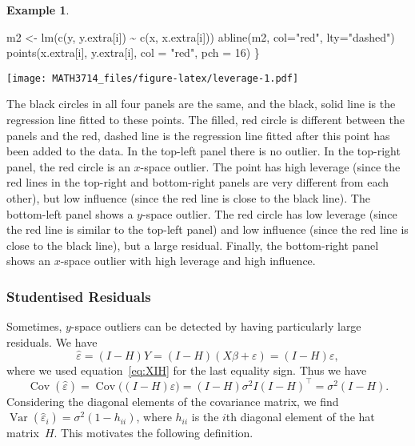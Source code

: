 \documentclass[
  a4paper,
]{article}
\newenvironment{Shaded}{\begin{snugshade}}{\end{snugshade}}
\newcommand{\AttributeTok}[1]{\textcolor[rgb]{0.77,0.63,0.00}{#1}}
\newcommand{\DecValTok}[1]{\textcolor[rgb]{0.00,0.00,0.81}{#1}}
\newcommand{\FunctionTok}[1]{\textcolor[rgb]{0.00,0.00,0.00}{#1}}
\newcommand{\NormalTok}[1]{#1}
\newcommand{\OtherTok}[1]{\textcolor[rgb]{0.56,0.35,0.01}{#1}}
\newcommand{\SpecialCharTok}[1]{\textcolor[rgb]{0.00,0.00,0.00}{#1}}
\newcommand{\StringTok}[1]{\textcolor[rgb]{0.31,0.60,0.02}{#1}}
\theoremstyle{definition}
\theoremstyle{definition}
\newtheorem{example}{Example}[section]
\theoremstyle{definition}
\theoremstyle{definition}
\theoremstyle{remark}
\begin{document}
\begin{example}
\begin{Shaded}
\begin{Highlighting}[]
\NormalTok{    m2 }\OtherTok{\textless{}{-}} \FunctionTok{lm}\NormalTok{(}\FunctionTok{c}\NormalTok{(y, y.extra[i]) }\SpecialCharTok{\textasciitilde{}} \FunctionTok{c}\NormalTok{(x, x.extra[i]))}
    \FunctionTok{abline}\NormalTok{(m2, }\AttributeTok{col=}\StringTok{"red"}\NormalTok{, }\AttributeTok{lty=}\StringTok{"dashed"}\NormalTok{)}
    \FunctionTok{points}\NormalTok{(x.extra[i], y.extra[i], }\AttributeTok{col =} \StringTok{"red"}\NormalTok{, }\AttributeTok{pch =} \DecValTok{16}\NormalTok{)}
\NormalTok{\}}
\end{Highlighting}
\end{Shaded}

\texttt{[image: MATH3714\_files/figure-latex/leverage-1.pdf]}

The black circles in all four panels are the same, and the black, solid line is
the regression line fitted to these points. The filled, red circle is
different between the panels and the red, dashed line is the regression line
fitted after this point has been added to the data. In the top-left panel
there is no outlier. In the top-right panel, the red circle is an \(x\)-space
outlier. The point has high leverage (since the red lines in the top-right and
bottom-right panels are very different from each other), but low influence
(since the red line is close to the black line). The bottom-left panel shows a
\(y\)-space outlier. The red circle has low leverage (since the red line is
similar to the top-left panel) and low influence (since the red line is close
to the black line), but a large residual. Finally, the bottom-right
panel shows an \(x\)-space outlier with high leverage and high influence.
\end{example}

\hypertarget{studentised-residuals}{%
\subsubsection{Studentised Residuals}\label{studentised-residuals}}

Sometimes, \(y\)-space outliers can be detected by having particularly
large residuals. We have
\begin{equation*}
  \hat\varepsilon
  = (I - H) Y
  = (I - H) (X\beta + \varepsilon)
  = (I - H) \varepsilon,
\end{equation*}
where we used equation~\eqref{eq:XIH} for the last equality sign.
Thus we have
\begin{equation*}
  \mathop{\mathrm{Cov}}(\hat\varepsilon)
  = \mathop{\mathrm{Cov}}\bigl( (I - H) \varepsilon\bigr)
  = (I - H) \sigma^2 I (I - H)^\top
  = \sigma^2 (I - H).
\end{equation*}
Considering the diagonal elements of the covariance matrix, we find
\(\mathop{\mathrm{Var}}(\hat\varepsilon_i) = \sigma^2 (1 - h_{ii})\), where \(h_{ii}\) is the \(i\)th
diagonal element of the hat matrix~\(H\). This motivates the following
definition.
\end{document}

